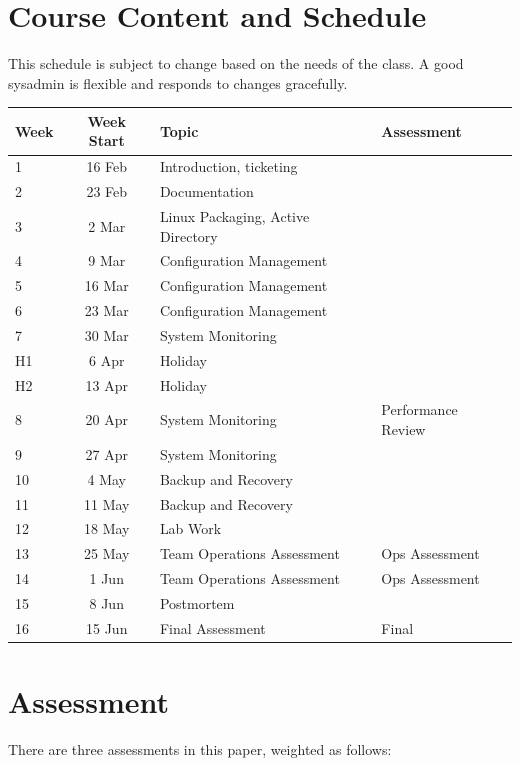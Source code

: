 \documentclass{article}
\begin{document}

\section*{Course Content and Schedule}
This schedule is subject to change based on the needs of the class. A good sysadmin is flexible and responds to changes gracefully.

\renewcommand{\arraystretch}{1.5}
\begin{tabular}{|l|c|l|l|}
\hline
 Week & Week Start & Topic                   & Assessment     \\ \hline
 1    & 16 Feb     & Introduction, ticketing & \\ \hline
 2    & 23 Feb     & Documentation           & \\ \hline
 3    &  2 Mar     & Linux Packaging, Active Directory  & \\ \hline
 4    &  9 Mar     & Configuration Management &    \\ \hline
5    & 16 Mar     & Configuration Management &     \\ \hline
6    & 23 Mar     & Configuration Management &     \\ \hline
 7    & 30 Mar     & System Monitoring  &  \\ \hline
 H1   &  6 Apr     & Holiday            & \\ \hline
 H2   & 13 Apr     & Holiday            & \\ \hline
 8    & 20 Apr     & System Monitoring  & Performance Review  \\ \hline
 9    & 27 Apr     & System Monitoring  &          \\ \hline
 10   &  4 May     & Backup and Recovery & \\ \hline
 11   & 11 May     & Backup and Recovery &  \\ \hline
 12   & 18 May     & Lab Work &  \\ \hline
 13   & 25 May     & Team Operations Assessment &  Ops Assessment \\ \hline
 14   &  1 Jun     & Team Operations Assessment &  Ops Assessment \\ \hline
 15   &  8 Jun     & Postmortem &  \\ \hline
 16   & 15 Jun     & Final Assessment & Final \\ \hline
\end{tabular}

\newpage 

\section*{Assessment}
There are three assessments in this paper, weighted as follows:
\end{document}
